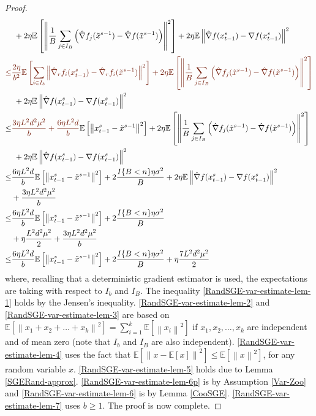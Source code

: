 \documentclass{article}
\newcommand*{\E}{\mathbb{E}}
\newcommand{\norm}[1]{\left\lVert#1\right\rVert}
\theoremstyle{definition}
\theoremstyle{remark}
\begin{document}
\begin{proof}
\begin{align}
   &\,\, \label{RandSGE-var-estimate-lem-3}+ 2\eta \E \left[ \norm{\frac{1}{B}\sum_{j\in I_B}\left(\hat{\nabla} f_j(\tilde{x}^{s-1}) - \hat{\nabla} f(\tilde{x}^{s-1})\right)}^2\right]+2\eta \E \norm{\hat{\nabla} f(x_{t-1}^s)-\nabla f(x_{t-1}^s)}^2\\
   {\color{Brown}
   \leq } &{\color{Brown}\frac{2\eta}{b^2}\E\left[\sum_{i\in I_b}\norm{\hat{\nabla}_r f_i(x_{t-1}^s)-\hat{\nabla}_r f_i(\tilde{x}^{s-1})}^2\right]+ 2\eta \E \left[ \norm{\frac{1}{B}\sum_{j\in I_B}\left(\hat{\nabla} f_j(\tilde{x}^{s-1}) - \hat{\nabla} f(\tilde{x}^{s-1})\right)}^2\right]}\notag\\
   &\,\,\label{RandSGE-var-estimate-lem-4}+2\eta \E \norm{\hat{\nabla} f(x_{t-1}^s)-\nabla f(x_{t-1}^s)}^2\\
    \leq  &{\color{Brown}\frac{3 \eta L^2 d^2 \mu^2}{b} + \frac{6\eta L^2 d}{b}}\E\left[\norm{x_{t-1}^s-\tilde{x}^{s-1}}^2\right]+ 2\eta \E \left[ \norm{\frac{1}{B}\sum_{j\in I_B}\left(\hat{\nabla} f_j(\tilde{x}^{s-1}) - \hat{\nabla} f(\tilde{x}^{s-1})\right)}^2\right]\notag\\
   &\,\,\label{RandSGE-var-estimate-lem-5}+2\eta \E \norm{\hat{\nabla} f(x_{t-1}^s)-\nabla f(x_{t-1}^s)}^2\\
   \leq  &\label{RandSGE-var-estimate-lem-6p}\frac{6\eta L^2d}{b}\E\left[\norm{x_{t-1}^s-\tilde{x}^{s-1}}^2\right]+ 2\frac{I\{B < n\}\eta \sigma ^2}{B}+2\eta \E \norm{\hat{\nabla} f(x_{t-1}^s)-\nabla f(x_{t-1}^s)}^2\notag\\
   & + \frac{3 \eta L^2 d^2 \mu^2}{b}\\
   \leq  &\frac{6\eta L^2 d}{b}\E\left[\norm{x_{t-1}^s-\tilde{x}^{s-1}}^2\right]+ 2\frac{I\{B < n\}\eta \sigma ^2}{B}\notag\\
   &\label{RandSGE-var-estimate-lem-6} +\eta \frac{L^2d^2\mu^2}{2}+ \frac{3 \eta L^2 d^2 \mu^2}{b}\\
   \leq  &\label{RandSGE-var-estimate-lem-7}\frac{6\eta L^2 d}{b}\E\left[\norm{x_{t-1}^s-\tilde{x}^{s-1}}^2\right]+ 2\frac{I\{B < n\}\eta \sigma ^2}{B}+\eta \frac{7L^2 d^2 \mu^2}{2} 
 \end{align}
 where, recalling that a deterministic gradient estimator is used, the expectations are taking with respect to $I_b$ and $I_B$. The inequality \eqref{RandSGE-var-estimate-lem-1} holds by the Jensen’s inequality. \eqref{RandSGE-var-estimate-lem-2} and \eqref{RandSGE-var-estimate-lem-3} are based on $\E[\norm{x_1+x_2+\ldots+x_k}^2] = \sum_{i=1}^k \E[\norm{x_i}^2]$ if $x_1,x_2,\ldots,x_k$ are independent and of mean zero (note that $I_b$ and $I_B$ are also independent). \eqref{RandSGE-var-estimate-lem-4} uses the fact that $\E[\norm{x-\E[x]}^2] \leq \E[\norm{x}^2]$, for any random variable $x$. \eqref{RandSGE-var-estimate-lem-5} holds due to Lemma \ref{SGERand-approx}. \eqref{RandSGE-var-estimate-lem-6p} is by Assumption \ref{Var-Zoo} and  \eqref{RandSGE-var-estimate-lem-6} is by Lemma \ref{CooSGE}. \eqref{RandSGE-var-estimate-lem-7} uses $b\geq 1$. The proof is now complete.
\end{proof}
\end{document}
